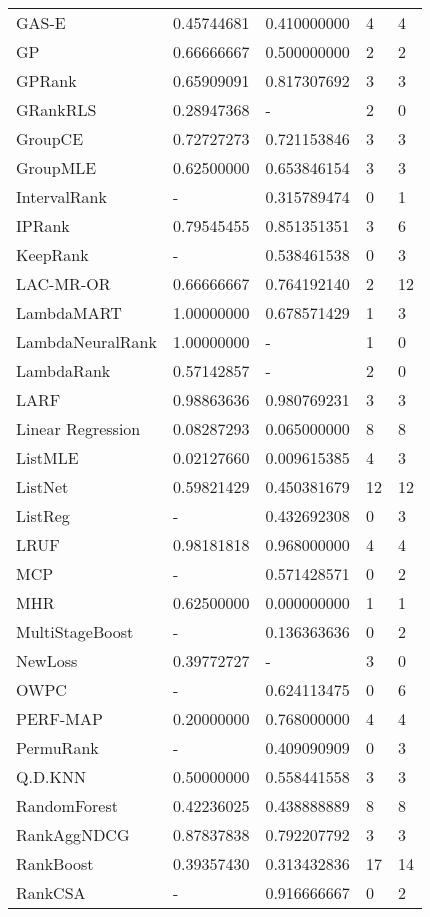 \begin{longtable}{l|p{2.3cm}|p{2.3cm}|p{2.3cm}|p{2.33cm}}
GAS-E & 0.45744681 & 0.410000000 & 4 & 4 \\ 
\acs{GP} & 0.66666667 & 0.500000000 & 2 & 2 \\ 
\acs{GP}Rank & 0.65909091 & 0.817307692 & 3 & 3 \\ 
GRank\acs{RLS} & 0.28947368 & - & 2 & 0 \\ 
GroupCE & 0.72727273 & 0.721153846 & 3 & 3 \\ 
Group\acs{MLE} & 0.62500000 & 0.653846154 & 3 & 3 \\
IntervalRank & - & 0.315789474 & 0 & 1 \\ 
\acs{IP}Rank & 0.79545455 & 0.851351351 & 3 & 6 \\
KeepRank & - & 0.538461538 & 0 & 3 \\ 
LAC-MR-OR & 0.66666667 & 0.764192140 & 2 & 12 \\ 
LambdaMART & 1.00000000 & 0.678571429 & 1 & 3 \\ 
LambdaNeuralRank & 1.00000000 & - & 1 & 0 \\ 
LambdaRank & 0.57142857 & - & 2 & 0 \\ 
LARF & 0.98863636 & 0.980769231 & 3 & 3 \\ 
Linear Regression & 0.08287293 & 0.065000000 & 8 & 8 \\ 
List\acs{MLE} & 0.02127660 & 0.009615385 & 4 & 3 \\ 
ListNet & 0.59821429 & 0.450381679 & 12 & 12 \\
ListReg & - & 0.432692308 & 0 & 3 \\ 
LRUF & 0.98181818 & 0.968000000 & 4 & 4 \\
MCP & - & 0.571428571 & 0 & 2 \\ 
MHR & 0.62500000 & 0.000000000 & 1 & 1 \\
MultiStageBoost & - & 0.136363636 & 0 & 2 \\  
NewLoss & 0.39772727 & - & 3 & 0 \\
OWPC & - & 0.624113475 & 0 & 6 \\ 
PERF-\acs{MAP} & 0.20000000 & 0.768000000 & 4 & 4 \\
PermuRank & - & 0.409090909 & 0 & 3 \\ 
Q.D.\acs{KNN} & 0.50000000 & 0.558441558 & 3 & 3 \\ 
RandomForest & 0.42236025 & 0.438888889 & 8 & 8 \\ 
RankAgg\acs{NDCG} & 0.87837838 & 0.792207792 & 3 & 3 \\ 
RankBoost & 0.39357430 & 0.313432836 & 17 & 14 \\
RankCSA & - & 0.916666667 & 0 & 2 \\

\end{longtable}
